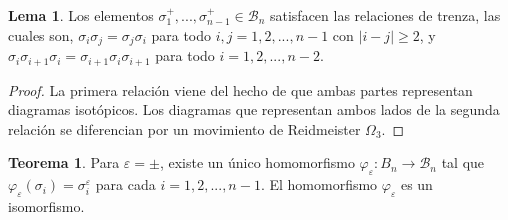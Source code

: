 \documentclass[12pt]{book}
\theoremstyle{definition}
\newtheorem{teor}{Teorema}[section]
\newtheorem{lema}{Lema}[section]
\begin{document}
\begin{lema}
Los elementos $\sigma_1^+,...,\sigma_{n-1}^+\in\mathcal{B}_n$ satisfacen las relaciones de trenza, las cuales son, $\sigma_i\sigma_j = \sigma_j\sigma_i$ para todo $i,j=1,2,...,n-1$ con $|i-j|\geq 2$, y $\sigma_i\sigma_{i+1}\sigma_i =\sigma_{i+1}\sigma_i\sigma_{i+1}$ para todo $i=1,2,...,n-2$.
\label{lema:rel_geom}
\end{lema}

\begin{proof} La primera relación viene del hecho de que ambas partes representan diagramas isotópicos. Los diagramas que representan ambos lados de la segunda relación se diferencian por un movimiento de Reidmeister $\Omega_3$.
\end{proof}

\begin{teor}
Para $\varepsilon = \pm$, existe un único homomorfismo $\varphi_\varepsilon : B_n\rightarrow\mathcal{B}_n$ tal que $\varphi_\varepsilon(\sigma_i) = \sigma_i^\varepsilon$ para cada $i=1,2,...,n-1$. El homomorfismo $\varphi_\varepsilon$ es un isomorfismo.
\end{teor}
\end{document}
